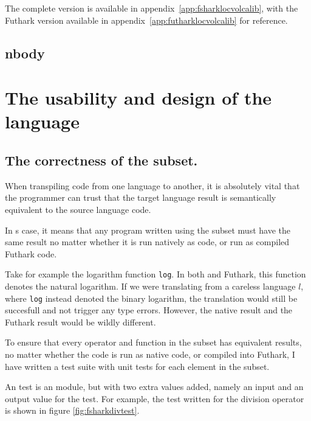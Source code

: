 The complete \fshark{} version is available in
appendix~\ref{app:fsharklocvolcalib}, with the Futhark version available in
appendix~\ref{app:futharklocvolcalib} for reference.

\subsection{nbody}













\section{The usability and design of the \fshark{} language}

\subsection{The correctness of the \fshark{} subset.}
\label{subsec:fsharkcorrectness}
When transpiling code from one language to another, it is absolutely vital that
the programmer can trust that the target language result
is semantically equivalent to the source language code.

In \fshark{}s case, it means that any program written using the \fshark{}
subset must have the same result no matter whether it is run natively as
\fsharp{} code, or run as \fshark{} compiled Futhark code.

Take for example the logarithm function \texttt{log}. In both \fsharp{} and
Futhark, this function denotes the natural logarithm. If we were translating
from a careless language $l$, where \texttt{log} instead denoted the binary
logarithm, the translation would still be succesfull and not trigger any type
errors.
However, the native result and the Futhark result would be wildly different.

To ensure that every operator and function in the \fshark{} subset has
equivalent results, no matter whether the \fshark{} code is run as native
\fsharp{} code, or compiled into Futhark, I have written a test suite with unit
tests for each element in the \fsharp{} subset. 

An \fshark{} test is an \fshark{} module, but with two extra values added,
namely an input and an output value for the test. For example, the test written for the
division operator is shown in figure \ref{fig:fsharkdivtest}.

